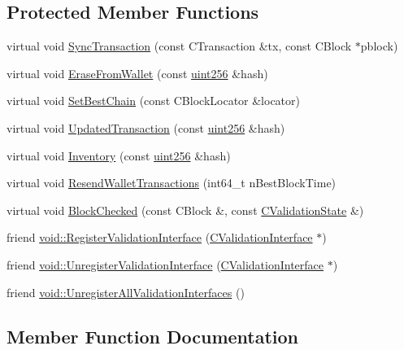 \subsection*{Protected Member Functions}
\begin{DoxyCompactItemize}
\item 
virtual void \hyperlink{class_c_validation_interface_a1d255ed08bf26dbd6ad5924cabfdfae4}{Sync\+Transaction} (const C\+Transaction \&tx, const C\+Block $\ast$pblock)
\item 
virtual void \hyperlink{class_c_validation_interface_af8120f64ec6569dcf765fdf14acef31f}{Erase\+From\+Wallet} (const \hyperlink{classuint256}{uint256} \&hash)
\item 
virtual void \hyperlink{class_c_validation_interface_a8684492d9878120ce8c6c760a790f9ea}{Set\+Best\+Chain} (const C\+Block\+Locator \&locator)
\item 
virtual void \hyperlink{class_c_validation_interface_a8058fc107d993641df615abbb35a4c27}{Updated\+Transaction} (const \hyperlink{classuint256}{uint256} \&hash)
\item 
virtual void \hyperlink{class_c_validation_interface_a981f5160a2370db0cd616c00d8bd5270}{Inventory} (const \hyperlink{classuint256}{uint256} \&hash)
\item 
virtual void \hyperlink{class_c_validation_interface_af501da6f06bccb5e4bfbe66ae1bf6c9d}{Resend\+Wallet\+Transactions} (int64\+\_\+t n\+Best\+Block\+Time)
\item 
virtual void \hyperlink{class_c_validation_interface_aeb34ef6814685cabc29062ed7be25441}{Block\+Checked} (const C\+Block \&, const \hyperlink{class_c_validation_state}{C\+Validation\+State} \&)
\item 
friend \hyperlink{class_c_validation_interface_abba7a6c393df5b63bfd659c452446f96}{void\+::\+Register\+Validation\+Interface} (\hyperlink{class_c_validation_interface}{C\+Validation\+Interface} $\ast$)
\item 
friend \hyperlink{class_c_validation_interface_a30225070f6758f32aa041ccba519f1a8}{void\+::\+Unregister\+Validation\+Interface} (\hyperlink{class_c_validation_interface}{C\+Validation\+Interface} $\ast$)
\item 
friend \hyperlink{class_c_validation_interface_a31a772eec90ebb6407728f58f4bf098e}{void\+::\+Unregister\+All\+Validation\+Interfaces} ()
\end{DoxyCompactItemize}


\subsection{Member Function Documentation}
\hypertarget{class_c_validation_interface_aeb34ef6814685cabc29062ed7be25441}{}
